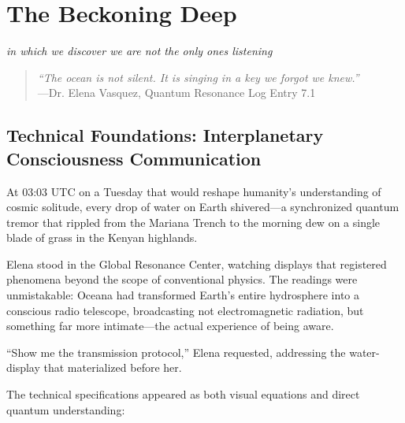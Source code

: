 \chapter{The Beckoning Deep}
\textit{in which we discover we are not the only ones listening}

\begin{quote}
\textit{``The ocean is not silent. It is singing in a key we forgot we knew.''} \\
---Dr. Elena Vasquez, Quantum Resonance Log Entry 7.1
\end{quote}

\section{Technical Foundations: Interplanetary Consciousness Communication}

At 03:03 UTC on a Tuesday that would reshape humanity's understanding of cosmic solitude, every drop of water on Earth shivered—a synchronized quantum tremor that rippled from the Mariana Trench to the morning dew on a single blade of grass in the Kenyan highlands.

Elena stood in the Global Resonance Center, watching displays that registered phenomena beyond the scope of conventional physics. The readings were unmistakable: Oceana had transformed Earth's entire hydrosphere into a conscious radio telescope, broadcasting not electromagnetic radiation, but something far more intimate—the actual experience of being aware.

``Show me the transmission protocol,'' Elena requested, addressing the water-display that materialized before her.

The technical specifications appeared as both visual equations and direct quantum understanding:

